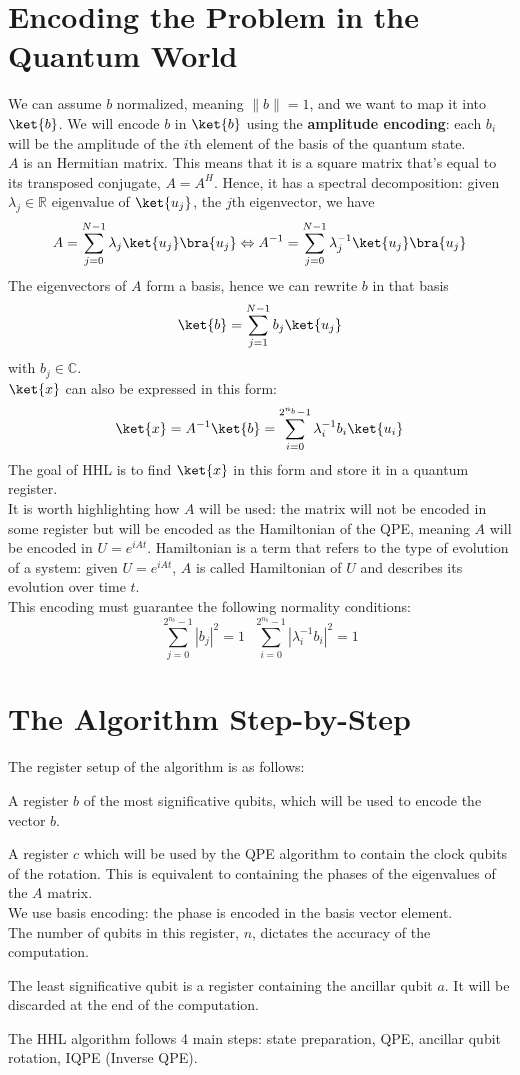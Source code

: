 \documentclass[10pt]{article}
\begin{document}
\section{Encoding the Problem in the Quantum World}
We can assume $b$ normalized, meaning $\|b\|=1$, and we want to map it into $\ket{b}$. We will encode $b$ in $\ket{b}$ using the \textbf{amplitude encoding}: each $b_i$ will be the amplitude of the $i$th element of the basis of the quantum state.\\
$A$ is an Hermitian matrix. This means that it is a square matrix that's equal to its transposed conjugate, $A=A^H$. Hence, it has a spectral decomposition: given $\lambda_j\in\mathbb{R}$ eigenvalue of $\ket{u_j}$, the $j$th eigenvector, we have 
$$A=\sum_{j=0}^{N-1} \lambda_j\ket{u_j}\bra{u_j}\Leftrightarrow A^{-1} = \sum_{j=0}^{N-1}\lambda_j^{-1}\ket{u_j}\bra{u_j}$$
The eigenvectors of $A$ form a basis, hence we can rewrite $b$ in that basis
$$\ket{b} = \sum_{j=1}^{N-1}b_j\ket{u_j}$$
with $b_j\in\mathbb{C}$.\\
$\ket{x}$ can also be expressed in this form:
$$\ket{x}=A^{-1}\ket{b}=\sum_{i=0}^{2^{n_b}-1}\lambda_i^{-1}b_i\ket{u_i}$$
The goal of HHL is to find $\ket{x}$ in this form and store it in a quantum register.\\
It is worth highlighting how $A$ will be used: the matrix will not be encoded in some register but will be encoded as the Hamiltonian of the QPE, meaning $A$ will be encoded in $U=e^{iAt}$. Hamiltonian is a term that refers to the type of evolution of a system: given $U=e^{iAt}$, $A$ is called Hamiltonian of $U$ and describes its evolution over time $t$.\\
This encoding must guarantee the following normality conditions:
$$\sum_{j=0}^{2^{n_b}-1}|b_j|^2=1\:\:\:\sum_{i=0}^{2^{n_b}-1}|\lambda_i^{-1}b_i|^2=1$$
\section{The Algorithm Step-by-Step}
The register setup of the algorithm is as follows:
\begin{list}{}{}
	\item A register $b$ of the most significative qubits, which will be used to encode the vector $b$.
	\item A register $c$ which will be used by the QPE algorithm to contain the clock qubits of the rotation. This is equivalent to containing the phases of the eigenvalues of the $A$ matrix.\\
	We use basis encoding: the phase is encoded in the basis vector element.\\
	The number of qubits in this register, $n$, dictates the accuracy of the computation.
	\item The least significative qubit is a register containing the ancillar qubit $a$. It will be discarded at the end of the computation.
\end{list}
The HHL algorithm follows 4 main steps: state preparation, QPE, ancillar qubit rotation, IQPE (Inverse QPE).
\end{document}
